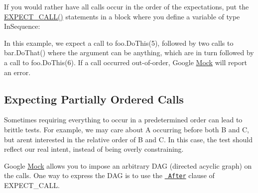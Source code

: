 If you would rather have all calls occur in the order of the expectations, put the {\ttfamily \mbox{\hyperlink{googletest-master_2googlemock_2include_2gmock_2gmock-spec-builders_8h_a535a6156de72c1a2e25a127e38ee5232}{E\+X\+P\+E\+C\+T\+\_\+\+C\+A\+L\+L()}}} statements in a block where you define a variable of type {\ttfamily In\+Sequence}\+:


\begin{DoxyCode}{0}
\DoxyCodeLine{}
\DoxyCodeLine{\{}
\DoxyCodeLine{}
\DoxyCodeLine{\}}
\end{DoxyCode}


In this example, we expect a call to {\ttfamily foo.\+Do\+This(5)}, followed by two calls to {\ttfamily bar.\+Do\+That()} where the argument can be anything, which are in turn followed by a call to {\ttfamily foo.\+Do\+This(6)}. If a call occurred out-\/of-\/order, Google \mbox{\hyperlink{class_mock}{Mock}} will report an error.

\subsection*{Expecting Partially Ordered Calls}

Sometimes requiring everything to occur in a predetermined order can lead to brittle tests. For example, we may care about {\ttfamily A} occurring before both {\ttfamily B} and {\ttfamily C}, but aren\textquotesingle{}t interested in the relative order of {\ttfamily B} and {\ttfamily C}. In this case, the test should reflect our real intent, instead of being overly constraining.

Google \mbox{\hyperlink{class_mock}{Mock}} allows you to impose an arbitrary D\+AG (directed acyclic graph) on the calls. One way to express the D\+AG is to use the \href{CheatSheet.md\#the-after-clause}{\texttt{ After}} clause of {\ttfamily E\+X\+P\+E\+C\+T\+\_\+\+C\+A\+LL}.

